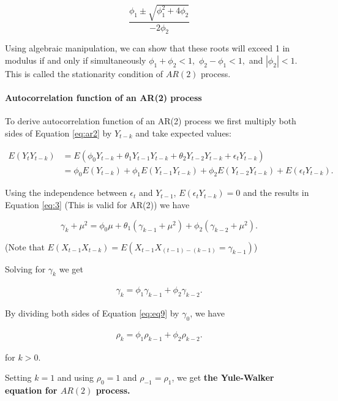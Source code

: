 \documentclass[]{book}
\let\oldparagraph\paragraph
\renewcommand{\paragraph}[1]{\oldparagraph{#1}\mbox{}}
\begin{document}
\[\frac{\phi_1 \pm \sqrt{\phi_1^2 + 4\phi_2}}{-2\phi_2}\]

Using algebraic manipulation, we can show that these roots will exceed 1 in modulus if and only if simultaneously \(\phi_1 + \phi_2 < 1,\) \(\phi_2-\phi_1 < 1,\) and \(|\phi_2| < 1.\) This is called the stationarity condition of \(AR(2)\) process.

\hypertarget{autocorrelation-function-of-an-ar2-process}{%
\paragraph{Autocorrelation function of an AR(2) process}\label{autocorrelation-function-of-an-ar2-process}}

To derive autocorrelation function of an AR(2) process we first multiply both sides of Equation \eqref{eq:ar2} by \(Y_{t-k}\) and take expected values:

\begin{align}
E(Y_tY_{t-k}) &= E(\phi_0Y_{t-k}+\theta_1Y_{t-1}Y_{t-k}+\theta_2Y_{t-2}Y_{t-k}+\epsilon_tY_{t-k} )\\
&= \phi_0 E(Y_{t-k})+\phi_{1}E(Y_{t-1}Y_{t-k}) + \phi_2 E(Y_{t-2} Y_{t-k}) + E(\epsilon_tY_{t-k}).
\end{align}

Using the independence between \(\epsilon_t\) and \(Y_{t-1}\), \(E(\epsilon_t Y_{t-k})=0\) and the results in Equation \eqref{eq:3} (This is valid for AR(2)) we have

\[\gamma_k + \mu^2 = \phi_0 \mu + \theta_1 (\gamma_{k-1}+\mu^2)+\phi_2 (\gamma_{k-2}+\mu^2).\]

(Note that \(E(X_{t-1}X_{t-k})=E(X_{t-1}X_{(t-1)-(k-1)}=\gamma_{k-1})\))

Solving for \(\gamma_k\) we get

\begin{align}
\label{eq:eq9}
 \gamma_k=\phi_1\gamma_{k-1}+\phi_2\gamma_{k-2}.
\end{align}

By dividing both sides of Equation \eqref{eq:eq9} by \(\gamma_0\), we have

\begin{align}
\label{eq:yule2}
 \rho_k=\phi_1\rho_{k-1}+\phi_2\rho_{k-2}.
\end{align}

for \(k>0\).

Setting \(k=1\) and using \(\rho_0=1\) and \(\rho_{-1}=\rho_1\), we get \textbf{the Yule-Walker equation for \(AR(2)\) process.}
\end{document}
